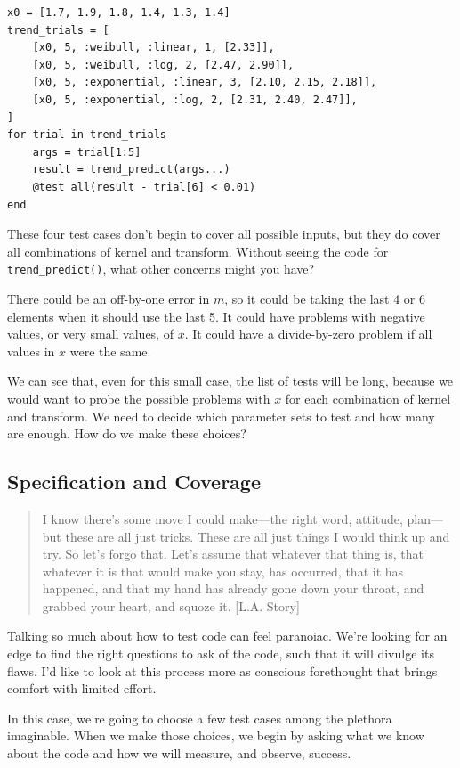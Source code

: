\documentclass[fleqn,10pt]{olplainarticle}
\begin{document}
\begin{lstlisting}
x0 = [1.7, 1.9, 1.8, 1.4, 1.3, 1.4]
trend_trials = [
    [x0, 5, :weibull, :linear, 1, [2.33]],
    [x0, 5, :weibull, :log, 2, [2.47, 2.90]],
    [x0, 5, :exponential, :linear, 3, [2.10, 2.15, 2.18]],
    [x0, 5, :exponential, :log, 2, [2.31, 2.40, 2.47]],
]
for trial in trend_trials
    args = trial[1:5]
    result = trend_predict(args...)
    @test all(result - trial[6] < 0.01)
end
\end{lstlisting}

These four test cases don't begin to cover all possible inputs,
but they do cover all combinations of kernel and transform.
Without seeing the code for \lstinline|trend_predict()|, what
other concerns might you have?

There could be an off-by-one
error in $m$, so it could be taking the last 4 or 6 elements
when it should use the last 5. It could have problems with
negative values, or very small values, of $x$. It could have
a divide-by-zero problem if all values in $x$ were the same.

We can see that, even for this small case, the list of tests
will be long, because we would want to probe the possible problems
with $x$ for each combination of kernel and transform.
We need to decide which parameter sets to test
and how many are enough. How do we make these choices?


\subsection{Specification and Coverage}

\begin{quotation}
I know there’s some move I could make---the right word, attitude, plan---but these are all just tricks. These are all just things I would think up and try. So let’s forgo that. Let’s assume that whatever that thing is, that whatever it is that would make you stay, has occurred, that it has happened, and that my hand has already gone down your throat, and grabbed your heart, and squoze it. [L.A. Story]
\end{quotation}

Talking so much about how to test code can feel paranoiac.
We're looking for an edge to find the right questions to ask
of the code, such that it will divulge its flaws.
I'd like to look at this process more as conscious forethought
that brings comfort with limited effort.

In this case, we're going to choose a few test cases among
the plethora imaginable. When we make those choices, we begin
by asking what we know about the code and how we will measure,
and observe, success.
\end{document}
